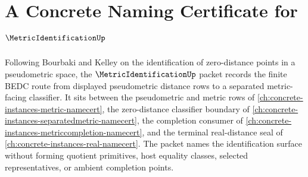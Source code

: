 \chapter{A Concrete Naming Certificate for $\MetricIdentificationUp$}
\label{ch:concrete-instances-metricidentification-namecert}

Following Bourbaki and Kelley on the identification of zero-distance points in a pseudometric space, the $\MetricIdentificationUp$ packet records the finite BEDC route from displayed pseudometric distance rows to a separated metric-facing classifier. It sits between the pseudometric and metric rows of \autoref{ch:concrete-instances-metric-namecert}, the zero-distance classifier boundary of \autoref{ch:concrete-instances-separatedmetric-namecert}, the completion consumer of \autoref{ch:concrete-instances-metriccompletion-namecert}, and the terminal real-distance seal of \autoref{ch:concrete-instances-real-namecert}. The packet names the identification surface without forming quotient primitives, host equality classes, selected representatives, or ambient completion points.

